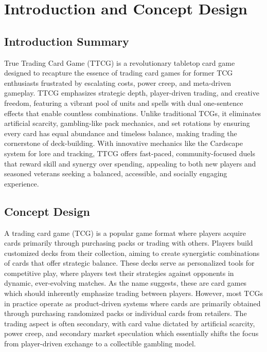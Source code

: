 \chapter{Introduction and Concept Design}

\section{Introduction Summary}

True Trading Card Game (TTCG) is a revolutionary tabletop card game designed to recapture the essence of trading card games for former TCG enthusiasts frustrated by escalating costs, power creep, and meta-driven gameplay. TTCG emphasizes strategic depth, player-driven trading, and creative freedom, featuring a vibrant pool of units and spells with dual one-sentence effects that enable countless combinations. Unlike traditional TCGs, it eliminates artificial scarcity, gambling-like pack mechanics, and set rotations by ensuring every card has equal abundance and timeless balance, making trading the cornerstone of deck-building. With innovative mechanics like the Cardscape system for lore and tracking, TTCG offers fast-paced, community-focused duels that reward skill and synergy over spending, appealing to both new players and seasoned veterans seeking a balanced, accessible, and socially engaging experience.



\section{Concept Design}

A trading card game (TCG) is a popular game format where players acquire cards primarily through purchasing packs or trading with others. Players build customized decks from their collection, aiming to create synergistic combinations of cards that offer strategic balance. These decks serve as personalized tools for competitive play, where players test their strategies against opponents in dynamic, ever-evolving matches. As the name suggests, these are card games which should inherently emphasize trading between players. However, most TCGs in practice operate as product-driven systems where cards are primarily obtained through purchasing randomized packs or individual cards from retailers. The trading aspect is often secondary, with card value dictated by artificial scarcity, power creep, and secondary market speculation which essentially shifts the focus from player-driven exchange to a collectible gambling model.


